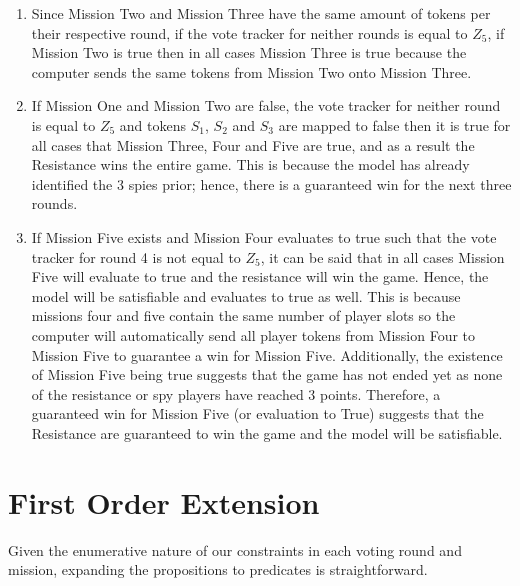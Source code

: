 \documentclass[pdftex,10pt,a4paper]{article}
\numberwithin{equation}{section} %
\begin{document}
\begin{enumerate}


	\item Since Mission Two and Mission Three have the same amount of tokens per their respective round, if the vote tracker for neither rounds is equal to $Z_5$, if Mission Two is true then in all cases Mission Three is true because the computer sends the same tokens from Mission Two onto Mission Three.
	\item If Mission One and Mission Two are false, the vote tracker for neither round is equal to $Z_5$ and tokens $S_1$, $S_2$ and $S_3$ are mapped to false then it is true for all cases that Mission Three, Four and Five are true, and as a result the Resistance wins the entire game. This is because the model has already identified the 3 spies prior; hence, there is a guaranteed win for the next three rounds.
	\item If Mission Five exists and Mission Four evaluates to true such that the vote tracker for round 4 is not equal to $Z_5$, it can be said that in all cases Mission Five will evaluate to true and the resistance will win the game. Hence, the model will be satisfiable and evaluates to true as well. This is because missions four and five contain the same number of player slots so the computer will automatically send all player tokens from Mission Four to Mission Five to guarantee a win for Mission Five. Additionally, the existence of Mission Five being true suggests that the game has not ended yet as none of the resistance or spy players have reached 3 points. Therefore, a guaranteed win for Mission Five (or evaluation to True) suggests that the Resistance are guaranteed to win the game and the model will be satisfiable. \newline

\end{enumerate}

\section*{First Order Extension}
Given the enumerative nature of our constraints in each voting round and mission, expanding the propositions to predicates is straightforward. \newline
\end{document}
